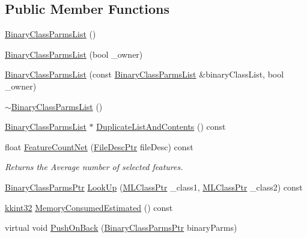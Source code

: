 \subsection*{Public Member Functions}
\begin{DoxyCompactItemize}
\item 
\hyperlink{class_k_k_m_l_l_1_1_binary_class_parms_list_a1fda708ad75218facb2d8f627a4c87ad}{Binary\+Class\+Parms\+List} ()
\item 
\hyperlink{class_k_k_m_l_l_1_1_binary_class_parms_list_a81b2b9de0600b0eb79a03fe1fb078384}{Binary\+Class\+Parms\+List} (bool \+\_\+owner)
\item 
\hyperlink{class_k_k_m_l_l_1_1_binary_class_parms_list_a1e072e091e5921394d696ebcb79f9cdd}{Binary\+Class\+Parms\+List} (const \hyperlink{class_k_k_m_l_l_1_1_binary_class_parms_list}{Binary\+Class\+Parms\+List} \&binary\+Class\+List, bool \+\_\+owner)
\item 
\hyperlink{class_k_k_m_l_l_1_1_binary_class_parms_list_afce047e2721643aba6f9c5fc4789ed07}{$\sim$\+Binary\+Class\+Parms\+List} ()
\item 
\hyperlink{class_k_k_m_l_l_1_1_binary_class_parms_list}{Binary\+Class\+Parms\+List} $\ast$ \hyperlink{class_k_k_m_l_l_1_1_binary_class_parms_list_a5ac10819cc4b7e3857ba9308038f7819}{Duplicate\+List\+And\+Contents} () const 
\item 
float \hyperlink{class_k_k_m_l_l_1_1_binary_class_parms_list_a28b156b8457805504a162433b5b2ee74}{Feature\+Count\+Net} (\hyperlink{namespace_k_k_m_l_l_aa0d0b6ab4ec18868a399b8455b05d914}{File\+Desc\+Ptr} file\+Desc) const 
\begin{DoxyCompactList}\small\item\em Returns the Average number of selected features. \end{DoxyCompactList}\item 
\hyperlink{namespace_k_k_m_l_l_aca399c0744e11553270ffaca507cfee7}{Binary\+Class\+Parms\+Ptr} \hyperlink{class_k_k_m_l_l_1_1_binary_class_parms_list_aab855a58369c229e40fa4b9248931a7e}{Look\+Up} (\hyperlink{namespace_k_k_m_l_l_ac272393853d59e72e8456f14cd6d8c23}{M\+L\+Class\+Ptr} \+\_\+class1, \hyperlink{namespace_k_k_m_l_l_ac272393853d59e72e8456f14cd6d8c23}{M\+L\+Class\+Ptr} \+\_\+class2) const 
\item 
\hyperlink{namespace_k_k_b_a8fa4952cc84fda1de4bec1fbdd8d5b1b}{kkint32} \hyperlink{class_k_k_m_l_l_1_1_binary_class_parms_list_a60b727ebd8d5e47268e200314d9ccf57}{Memory\+Consumed\+Estimated} () const 
\item 
virtual void \hyperlink{class_k_k_m_l_l_1_1_binary_class_parms_list_a39d338e2b3cae165227fbb4441b5f917}{Push\+On\+Back} (\hyperlink{namespace_k_k_m_l_l_aca399c0744e11553270ffaca507cfee7}{Binary\+Class\+Parms\+Ptr} binary\+Parms)

\end{DoxyCompactItemize}
